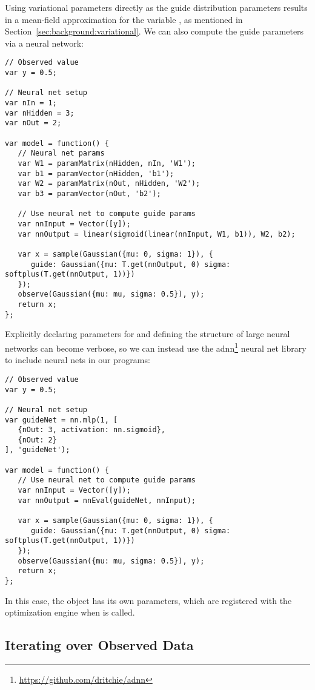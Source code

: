 Using variational parameters directly as the guide distribution parameters results in a mean-field approximation for the variable , as mentioned in Section~\ref{sec:background:variational}.
We can also compute the guide parameters via a neural network:~
\begin{lstlisting}
// Observed value
var y = 0.5;

// Neural net setup
var nIn = 1;
var nHidden = 3;
var nOut = 2;

var model = function() {
   // Neural net params
   var W1 = paramMatrix(nHidden, nIn, 'W1');
   var b1 = paramVector(nHidden, 'b1');
   var W2 = paramMatrix(nOut, nHidden, 'W2');
   var b3 = paramVector(nOut, 'b2');

   // Use neural net to compute guide params
   var nnInput = Vector([y]);
   var nnOutput = linear(sigmoid(linear(nnInput, W1, b1)), W2, b2);

   var x = sample(Gaussian({mu: 0, sigma: 1}), {
      guide: Gaussian({mu: T.get(nnOutput, 0) sigma: softplus(T.get(nnOutput, 1))})
   });
   observe(Gaussian({mu: mu, sigma: 0.5}), y);
   return x;
};
\end{lstlisting}
Explicitly declaring parameters for and defining the structure of large neural networks can become verbose, so we can instead use the adnn\footnote{\url{https://github.com/dritchie/adnn}} neural net library to include neural nets in our programs:
\begin{lstlisting}
// Observed value
var y = 0.5;

// Neural net setup
var guideNet = nn.mlp(1, [
   {nOut: 3, activation: nn.sigmoid},
   {nOut: 2}
], 'guideNet');

var model = function() {
   // Use neural net to compute guide params
   var nnInput = Vector([y]);
   var nnOutput = nnEval(guideNet, nnInput);

   var x = sample(Gaussian({mu: 0, sigma: 1}), {
      guide: Gaussian({mu: T.get(nnOutput, 0) sigma: softplus(T.get(nnOutput, 1))})
   });
   observe(Gaussian({mu: mu, sigma: 0.5}), y);
   return x;
};
\end{lstlisting}
In this case, the  object has its own parameters, which are registered with the optimization engine when  is called.

\subsection{Iterating over Observed Data}

